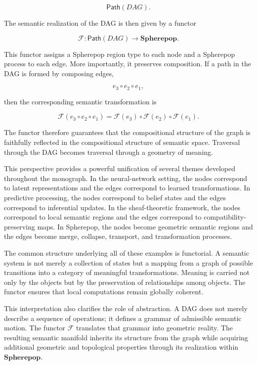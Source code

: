 \documentclass[12pt,letterpaper]{article}
\theoremstyle{remark}
\begin{document}
\[
\mathsf{Path}(DAG).
\]

The semantic realization of the DAG is then given by a functor

\[
\mathcal{F}
:
\mathsf{Path}(DAG)
\to
\mathbf{Spherepop}.
\]

This functor assigns a Spherepop region type to each node and a Spherepop process to each edge. More importantly, it preserves composition. If a path in the DAG is formed by composing edges,

\[
e_3 \circ e_2 \circ e_1,
\]

then the corresponding semantic transformation is

\[
\mathcal{F}(e_3 \circ e_2 \circ e_1)
= 
\mathcal{F}(e_3)
\circ
\mathcal{F}(e_2)
\circ
\mathcal{F}(e_1).
\]

The functor therefore guarantees that the compositional structure of the graph is faithfully reflected in the compositional structure of semantic space. Traversal through the DAG becomes traversal through a geometry of meaning.

This perspective provides a powerful unification of several themes developed throughout the monograph. In the neural-network setting, the nodes correspond to latent representations and the edges correspond to learned transformations. In predictive processing, the nodes correspond to belief states and the edges correspond to inferential updates. In the sheaf-theoretic framework, the nodes correspond to local semantic regions and the edges correspond to compatibility-preserving maps. In Spherepop, the nodes become geometric semantic regions and the edges become merge, collapse, transport, and transformation processes.

The common structure underlying all of these examples is functorial. A semantic system is not merely a collection of states but a mapping from a graph of possible transitions into a category of meaningful transformations. Meaning is carried not only by the objects but by the preservation of relationships among objects. The functor ensures that local computations remain globally coherent.

This interpretation also clarifies the role of abstraction. A DAG does not merely describe a sequence of operations; it defines a grammar of admissible semantic motion. The functor $\mathcal{F}$ translates that grammar into geometric reality. The resulting semantic manifold inherits its structure from the graph while acquiring additional geometric and topological properties through its realization within $\mathbf{Spherepop}$.
\end{document}
